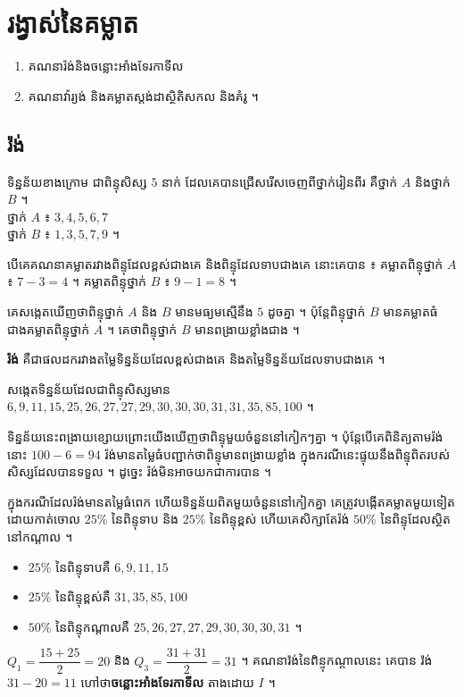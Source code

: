 \chapter{រង្វាស់នៃគម្លាត}

\begin{objBox}[វត្ថុបំណង]
\begin{enumerate}[1]
  \item គណនារ៉ង់និងចន្លោះអាំងទែរកាទីល
  \item គណនាវ៉ារ្យង់ និងគម្លាតស្តង់ដាស្ថិតិសកល និងគំរូ ។
\end{enumerate}
\end{objBox}

\section{រ៉ង់}

\begin{example}[ឧទាហរណ៍ ១]
ទិន្នន័យខាងក្រោម ជាពិន្ទុសិស្ស $5$ នាក់ ដែលគេបានជ្រើសរើសចេញពីថ្នាក់រៀនពីរ គឺថ្នាក់ $A$ និងថ្នាក់ $B$ ។\\
ថ្នាក់ $A$ ៖ $3, 4, 5, 6, 7$\\
ថ្នាក់ $B$ ៖ $1, 3, 5, 7, 9$ ។
\end{example}
បើគេគណនាគម្លាតរវាងពិន្ទុដែលខ្ពស់ជាងគេ និងពិន្ទុដែលទាបជាងគេ នោះគេបាន ៖ គម្លាតពិន្ទុថ្នាក់ $A$ ៖ $7 - 3 = 4$ ។ គម្លាតពិន្ទុថ្នាក់ $B$ ៖ $9 - 1 = 8$ ។

គេសង្កេតឃើញថាពិន្ទុថ្នាក់ $A$ និង $B$ មានមធ្យមស្មើនឹង $5$ ដូចគ្នា ។ ប៉ុន្តែពិន្ទុថ្នាក់ $B$ មានគម្លាតធំជាងគម្លាតពិន្ទុថ្នាក់ $A$ ។ គេថាពិន្ទុថ្នាក់ $B$ មានពង្រាយខ្លាំងជាង ។

\begin{definition}[និយមន័យ]
\textbf{រ៉ង់} គឺជាផលដករវាងតម្លៃទិន្នន័យដែលខ្ពស់ជាងគេ និងតម្លៃទិន្នន័យដែលទាបជាងគេ ។
\end{definition}

\begin{example}[ឧទាហរណ៍ ២]
សង្កេតទិន្នន័យដែលជាពិន្ទុសិស្សមាន $6, 9, 11, 15, 25, 26, 27, 27, 29, 30, 30, 30, 31, 31, 35, 85, 100$ ។
\end{example}
ទិន្នន័យនេះពង្រាយខ្សោយព្រោះយើងឃើញថាពិន្ទុមួយចំនួននៅកៀកៗគ្នា ។ ប៉ុន្តែបើគេពិនិត្យតាមរ៉ង់នោះ $100 - 6 = 94$ រ៉ង់មានតម្លៃធំបញ្ជាក់ថាពិន្ទុមានពង្រាយខ្លាំង ក្នុងករណីនេះផ្ទុយនឹងពិន្ទុពិតរបស់សិស្សដែលបានទទួល ។ ដូច្នេះ រ៉ង់មិនអាចយកជាការបាន ។

ក្នុងករណីដែលរ៉ង់មានតម្លៃធំពេក ហើយទិន្នន័យពិតមួយចំនួននៅកៀកគ្នា គេត្រូវបង្កើតគម្លាតមួយទៀតដោយកាត់ចោល $25\%$ នៃពិន្ទុទាប និង $25\%$ នៃពិន្ទុខ្ពស់ ហើយគេសិក្សាតែរ៉ង់ $50\%$ នៃពិន្ទុដែលស្ថិតនៅកណ្ដាល ។
\begin{itemize}
  \item $25\%$ នៃពិន្ទុទាបគឺ $6, 9, 11, 15$
  \item $25\%$ នៃពិន្ទុខ្ពស់គឺ $31, 35, 85, 100$
  \item $50\%$ នៃពិន្ទុកណ្ដាលគឺ $25, 26, 27, 27, 29, 30, 30, 30, 31$ ។
\end{itemize}
$Q_1 = \dfrac{15 + 25}{2} = 20$ និង $Q_3 = \dfrac{31 + 31}{2} = 31$ ។ គណនារ៉ង់នៃពិន្ទុកណ្ដាលនេះ គេបាន រ៉ង់ $31 - 20 = 11$ ហៅថា\textbf{ចន្លោះអាំងទែរកាទីល} តាងដោយ $I$ ។

